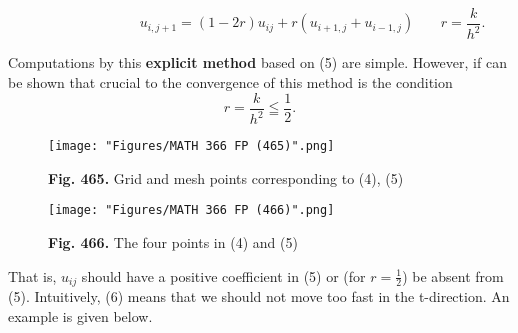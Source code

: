 \begin{graybox}
\begin{equation}\tag{21.5}
\hspace{90pt}u_{i,j+1}=(1-2r)u_{ij}+r(u_{i+1,j}+u_{i-1,j})\hspace{20pt}\ r=\frac{k}{h^2}.
\end{equation}
\end{graybox}
Computations by this \textbf{explicit method} based on (5) are simple. However, if can be shown that crucial to the convergence of this method is the condition
\begin{equation}\tag{21.6}
r=\frac{k}{h^2}\leqq\frac{1}{2}.
\end{equation}
\begin{figure}[htbp]
\begin{center}
\texttt{[image: "Figures/MATH 366 FP (465)".png]}
\caption*{\small{\textbf{\color{blue} Fig. 465.}} Grid and mesh points corresponding to (4), (5)}
\end{center}
\end{figure}
\begin{figure}[htbp]
\begin{center}
\texttt{[image: "Figures/MATH 366 FP (466)".png]}
\caption*{\small{\textbf{\color{blue} Fig. 466.}} The four points in (4) and (5)}
\end{center}
\end{figure}
\newline
That is, $u_{ij}$ should have a positive coefficient in (5) or (for $r=\frac{1}{2}$) be absent from (5). Intuitively, (6) means that we should not move too fast in the t-direction. An example is given below.
